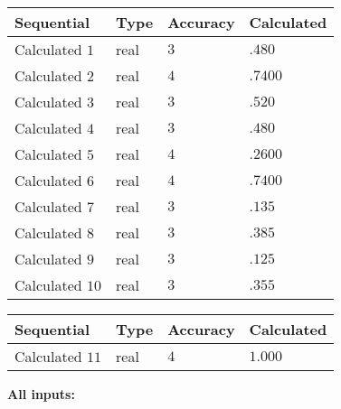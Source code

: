 \documentclass[12pt]{article}
\begin{document}
  
\noindent\begin{tabular}{|l|l|l|l|}
\hline
 Sequential & Type & Accuracy & Calculated \\ 
\hline
 
 
  Calculated $           1$ & real & $           3 $ & 
 $ .480 $ 
 \\  \hline  
 
 
  Calculated $           2$ & real & $           4 $ & 
 $ .7400 $ 
 \\  \hline  
 
 
  Calculated $           3$ & real & $           3 $ & 
 $ .520 $ 
 \\  \hline  
 
 
  Calculated $           4$ & real & $           3 $ & 
 $ .480 $ 
 \\  \hline  
 
 
  Calculated $           5$ & real & $           4 $ & 
 $ .2600 $ 
 \\  \hline  
 
 
  Calculated $           6$ & real & $           4 $ & 
 $ .7400 $ 
 \\  \hline  
 
 
  Calculated $           7$ & real & $           3 $ & 
 $ .135 $ 
 \\  \hline  
 
 
  Calculated $           8$ & real & $           3 $ & 
 $ .385 $ 
 \\  \hline  
 
 
  Calculated $           9$ & real & $           3 $ & 
 $ .125 $ 
 \\  \hline  
 
 
  Calculated $          10$ & real & $           3 $ & 
 $ .355 $ 
 \\  \hline  
 \end{tabular}
   
   
  
  
\noindent\begin{tabular}{|l|l|l|l|}
\hline
 Sequential & Type & Accuracy & Calculated \\ 
\hline
 
 
  Calculated $          11$ & real & $           4 $ & 
 $ 1.000 $ 
 \\  \hline  
 \end{tabular}
   
   
   
   
\noindent\vspace{0.1in}\hspace{-0.08in} {\textbf{\Large{All inputs: }}}
   
\end{document}

